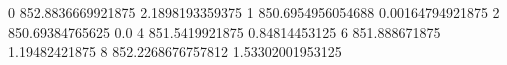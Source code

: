 0 852.8836669921875 2.1898193359375
1 850.6954956054688 0.00164794921875
2 850.69384765625 0.0
4 851.5419921875 0.84814453125
6 851.888671875 1.19482421875
8 852.2268676757812 1.53302001953125
